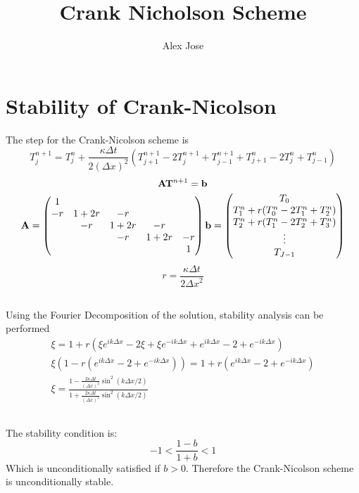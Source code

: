\documentclass[11pt]{article}
\title{\textbf{Crank Nicholson Scheme}}
\author{Alex Jose}
\date{}
\newcommand{\dx}{\Delta x}
\newcommand{\dt}{\Delta t}
\begin{document}
\maketitle

\section{Stability of Crank-Nicolson}
The step for the Crank-Nicolson scheme is
\begin{equation}
	T_{j}^{n + 1} =
	T_{j}^{n} + \frac{\kappa\Delta t}{2{(\Delta x)}^2}\left(
		T_{j+1}^{n+1} - 2 T_{j}^{n+1} + T_{j-1}^{n+1} + 
		T_{j+1}^{n} - 2 T_{j}^{n} + T_{j-1}^{n}
	\right)
	\label{implicit}
\end{equation}
\begin{equation}
	\vb{A}\vb{T}^{n+1} = \vb{b}
\end{equation}
\begin{equation}
	\begin{split}
		\vb{A} =     
		\begin{pmatrix}
1 &  &  &  & \\ 
 -r&  1+2r&  -r&  & \\ 
 &  -r&  1+2r&  -r& \\ 
 &  &-r  & 1+2r &-r \\ 
 &  &  &  &1 \\
 \end{pmatrix}
 \vb{b} = 
 \begin{pmatrix}
T_0\\
T_{1}^{n}+r(T_{0}^{n}-2T_{1}^{n}+T_{2}^{n})\\
T_{2}^{n}+r(T_{1}^{n}-2T_{2}^{n}+T_{3}^{n})\\
\vdots\\
T_{J-1}
\end{pmatrix}
 \end{split}
\end{equation}
\[r = \frac{\kappa \dt}{2 {\dx}^2}\]
\subsection{}
Using the Fourier Decomposition of the solution, stability analysis can be performed
\begin{equation}
	\begin{split}
	\xi = 1 + r(\xi e^{ik\dx} - 2\xi + \xi e^{-ik\dx} + e^{ik\dx}
	- 2 + e^{-ik\dx}) \\
	\xi(1 - r(e^{ik\dx} - 2 + e^{-ik\dx})) = 1 + r(e^{ik\dx} - 2 + e^{-ik\dx})\\
	\xi = \frac{1 - \frac{2\kappa \dt}{(\dx)^2}\sin^2(k\dx /2)}
	{1 + \frac{2\kappa \dt}{(\dx)^2}\sin^2(k\dx /2)}
\end{split}
\end{equation}
\subsection{}
The stability condition is:
\begin{equation}
	-1 < \frac{1 - b}{1 + b} < 1
\end{equation}
Which is unconditionally satisfied if $b > 0$. Therefore the Crank-Nicolson scheme is unconditionally stable.
\end{document}
